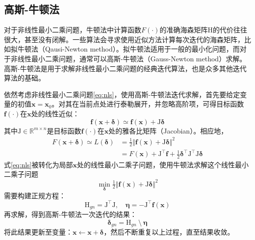 \subsection{高斯-牛顿法}\label{sec:gn}

对于非线性最小二乘问题，牛顿法中计算函数$F(\cdot)$的准确海森矩阵$\mathrm{H}$的代价往往很大，甚至没有闭解。一些算法会寻求使用近似方法计算每次迭代的海森矩阵，比如拟牛顿法\citep{tingleff2004methods}（Qausi-Newton method）。拟牛顿法适用于一般的最小化问题，而对于非线性最小二乘问题，通常可以高斯-牛顿法（Gauss-Newton method）求解。高斯-牛顿法是用于求解非线性最小二乘问题的经典迭代算法，也是众多其他迭代算法的基础。

依然考虑非线性最小二乘问题\eqref{eq:nls}，使用高斯-牛顿法迭代求解，首先要给定变量的初值$\bm{x}=\bm{x}_0$。对其在当前点处进行泰勒展开，并忽略高阶项，可得目标函数$\bm{f}(\cdot)$在$\bm{x}$处的线性近似：
\begin{equation}
    \bm{f}(\bm{x}+\bm{\delta}) \simeq \bm{f}(\bm{x}) + \mathrm{J}\bm{\delta}
\end{equation}
其中$\mathrm{J}\in\mathbb{R}^{m \times n}$是目标函数$\bm{f}(\cdot)$在$\bm{x}$处的雅各比矩阵（Jacobian）。相应地，
\begin{equation}
\begin{aligned}
    F(\bm{x}+\bm{\delta}) \simeq L(\bm{\delta})
        &= \tfrac{1}{2} \Vert \bm{f}(\bm{x}) + \mathrm{J}\bm{\delta} \Vert^2 \\
        &= F(\bm{x}) + \mathrm{J}^\top\bm{f} +
           \tfrac{1}{2}\bm{\delta}^\top\mathrm{J}^\top\mathrm{J}\bm{\delta}
\end{aligned}
\label{eq:linmod}
\end{equation}
式\eqref{eq:nls}被转化为局部$\bm{x}$处的线性最小二乘子问题，使用牛顿法求解这个线性最小二乘子问题
\begin{equation}
    \min_{\bm{\delta}} \tfrac{1}{2}
    \Vert \bm{f}(\bm{x}) + \mathrm{J}\bm{\delta} \Vert^2
    \label{eq:lls}
\end{equation}
需要构建正规方程：
\begin{equation}
    \mathrm{H}_{gn} = \mathrm{J}^\top\mathrm{J}, \quad
    \bm{\eta}       = -\mathrm{J}^\top\bm{f}(\bm{x})
    \label{eq:normal_eq}
\end{equation}
再求解，得到高斯-牛顿法一次迭代的结果：
\begin{equation}
    \bm{\delta}_{gn} = \mathrm{H}_{gn} \:\setminus\: \bm{\eta}
    \label{eq:gn}
\end{equation}
将此结果更新至变量：$\bm{x}\leftarrow\bm{x}+\bm{\delta}$，然后不断重复以上过程，直至结果收敛。

